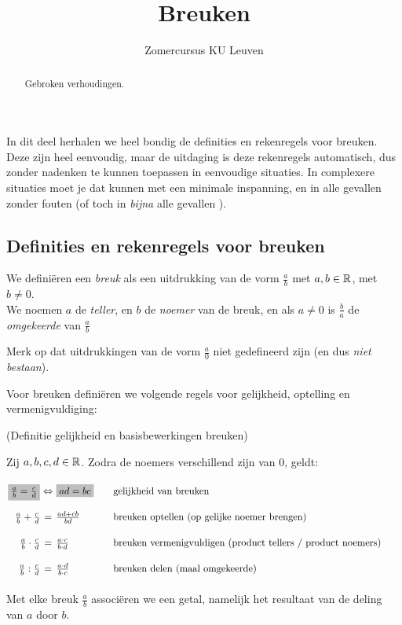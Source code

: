 \documentclass[numbers]{ximera}
\author{Zomercursus KU Leuven}
\title[Rekenvaardigheden:]{Breuken}
\begin{document}
\begin{abstract}
	Gebroken verhoudingen.
\end{abstract}
\maketitle

In dit deel herhalen we heel bondig de definities en rekenregels voor
breuken. Deze zijn heel eenvoudig, maar de uitdaging is deze rekenregels automatisch, dus zonder nadenken te kunnen toepassen in eenvoudige situaties. In complexere situaties moet je dat kunnen met een minimale inspanning, en in alle gevallen zonder fouten (of toch in \textit{bijna} alle gevallen \Smiley).

\subsection{Definities en rekenregels voor breuken}
We definiëren een \textit{breuk} als een uitdrukking van de vorm $\frac{a}{b}$ met $a,b\in\mathbb{R}$, met $b\neq0$. 
\\We noemen $a$ de \textit{teller}, en $b$ de \textit{noemer} van de breuk, en als $a\neq0$ is $\frac ba$ de \textit{omgekeerde} van $\frac ab$ 

Merk op dat uitdrukkingen van de vorm $\frac a0$ niet gedefineerd zijn (en dus \textit{niet bestaan}).  

Voor breuken definiëren we volgende regels voor gelijkheid, optelling en vermenigvuldiging: 

\begin{definition} (Definitie gelijkheid en basisbewerkingen breuken)
	
Zij $a,b,c,d\in \mathbb{R}$. Zodra de noemers verschillend zijn van $0$, geldt:
\[
	\arraycolsep=1.4pt\def\arraystretch{2.2}
	\begin{array}{r@{\ }c@{\ }l@{\qquad}l@{\qquad}l}
		\important{\frac{a}{b} = \frac{c}{d}}  &\iff& \important{ad = bc} 
			& \textrm{gelijkheid van breuken} \\
		\frac{a}{b}+\frac{c}{d} &=& \frac{ad+cb}{bd} 
			& \textrm{breuken optellen (op gelijke noemer brengen)} \\
		\frac{a}{b} \cdot \frac{c}{d} &=& \frac{a\cdot c}{b\cdot d} 
			& \textrm{breuken vermenigvuldigen (product tellers $/$ product noemers)} \\
		\frac{a}{b} : \frac{c}{d} &=& \frac{a\cdot d}{b\cdot c} 
		& \textrm{breuken delen (maal omgekeerde)} \\
\end{array}			
\]
\end{definition}
Met elke breuk $\frac ab$ associëren we een getal, namelijk het resultaat van de deling van $a$ door $b$.
\end{document}

